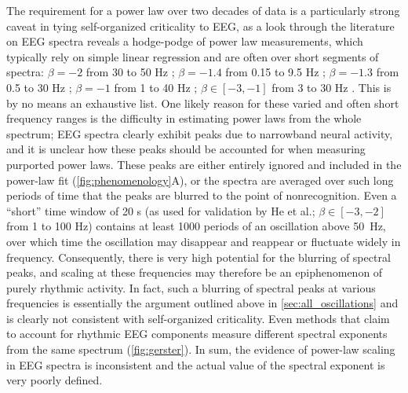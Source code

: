 The requirement for a power law over two decades of data is a particularly strong caveat in tying self-organized criticality to EEG, as a look through the literature on EEG spectra reveals a hodge-podge of power law measurements, which typically rely on simple linear regression and are often over short segments of spectra: $\beta=-2$ from 30 to 50 Hz \cite{Lendner2020}; $\beta=-1.4$ from 0.15 to 9.5 Hz \cite{Dehghani2010}; $\beta=-1.3$ from 0.5 to 30 Hz \cite{Pritchard1992};  $\beta=-1$ from 1 to 40 Hz \cite{Colombo2019}; $\beta\in[-3,-1]$ from 3 to 30 Hz \cite{Pereda1998}. This is by no means an exhaustive list. One likely reason for these varied and often short frequency ranges is the difficulty in estimating power laws from the whole spectrum; EEG spectra clearly exhibit peaks due to narrowband neural activity, and it is unclear how these peaks should be accounted for when measuring purported power laws. These peaks are either entirely ignored and included in the power-law fit (\autoref{fig:phenomenology}A), or the spectra are averaged over such long periods of time that the peaks are blurred to the point of nonrecognition. Even a ``short'' time window of 20 s (as used for validation by He et al.\cite{He2010}; $\beta\in[-3,-2]$ from 1 to 100 Hz) contains at least 1000 periods of an oscillation above \qty{50}{\hertz}, over which time the oscillation may disappear and reappear or fluctuate widely in frequency. Consequently, there is very high potential for the blurring of spectral peaks, and scaling at these frequencies may therefore be an epiphenomenon of purely rhythmic activity. In fact, such a blurring of spectral peaks at various frequencies is essentially the argument outlined above in \autoref{sec:all_oscillations} and is clearly not consistent with self-organized criticality. Even methods that claim to account for rhythmic EEG components measure different spectral exponents from the same spectrum (\autoref{fig:gerster}).  In sum, the evidence of power-law scaling in EEG spectra is inconsistent and the actual value of the spectral exponent is very poorly defined. 

